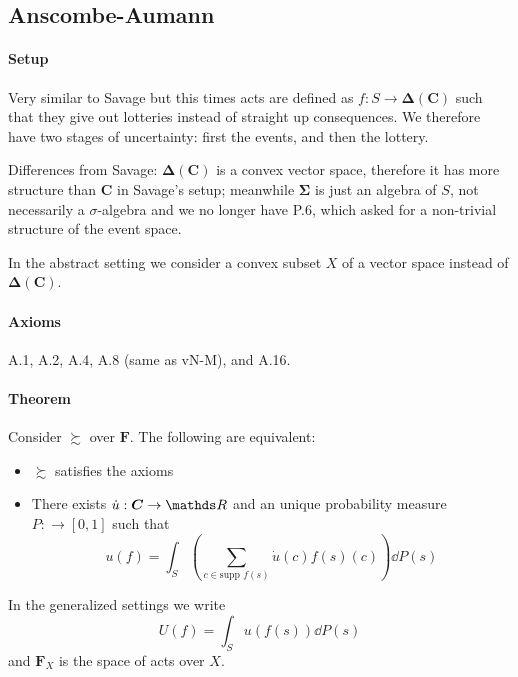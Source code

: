 \documentclass[landscape, 12pt]{extarticle}
\begin{document}
\begin{multicols}{2}
	\subsection{Anscombe-Aumann}

	\paragraph{Setup}
	Very similar to Savage
	but this times acts are defined as $f: S \to \bm \Delta(\bm C)$
	such that they give out lotteries instead of straight up consequences.
	We therefore have two stages of uncertainty: first the events, and then the lottery.

	Differences from Savage: $\bm \Delta(\bm C)$ is a convex vector space,
	therefore it has more structure than $\bm C$ in Savage's setup;
	meanwhile $\bm \Sigma$ is just an algebra	of $S$, not necessarily a $\sigma$-algebra
	and we no longer have P.6, which asked for a non-trivial structure of the event space.

	In the abstract setting we consider a convex subset $X$ of a vector space
	instead of $\bm \Delta(\bm C)$.

	\paragraph{Axioms} A.1, A.2, A.4, A.8 (same as vN-M), and A.16.

	\paragraph{Theorem}
	Consider $\succsim$ over $\bm F$.
	The following are equivalent:
	\begin{itemize}
		\item $\succsim$ satisfies the axioms
		\item There exists $\dot u: \bm C \to \R$ and an unique probability measure $P: \bm \to [0, 1]$
		      such that
		      \[
			      u(f) = \int_S \left( \sum_{c\in \text{supp } f(s)} \dot u(c) f(s)(c) \right) \dd P(s)
		      \]
	\end{itemize}
	In the generalized settings we write
	\[
		U(f) = \int_S u(f(s))\dd P(s)
	\]
	and $\bm F_X$ is the space of acts over $X$.


\end{multicols}
\end{document}

